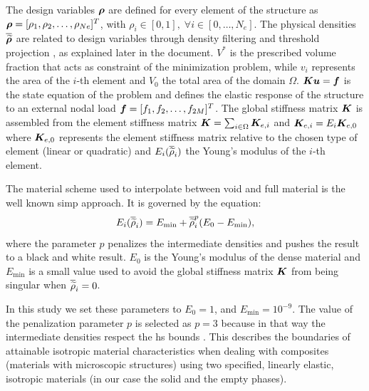 The design variables $\bm{\rho}$ are defined for every element of the structure as $\bm{\rho} = [\rho_1, \rho_2, \ldots,\rho_{Ne}]^T$, with $\rho_i \in [0,1], \; \forall i \in [0,\dots,N_e]$. The physical densities $\bm{\overline{\widetilde{\rho}}}$ are related to design variables through density filtering and threshold projection , as explained later in the document. $V^*$ is the prescribed volume fraction that acts as constraint of the minimization problem, while $v_i$ represents the area of the $i$-th element and $V_0$ the total area of the domain $\Omega$. $\bm{K}\bm{u} = \bm{f}$ is the state equation of the problem and defines the elastic response of the structure to an external nodal load $\bm{f}=[f_1, f_2, \ldots,f_{2M}]^T$. The global stiffness matrix $\bm{K}$ is assembled from the element stiffness matrix $\bm{K} = \sum_{i \in \Omega} \bm{K}_{e,i}$ and $\bm{K}_{e,i} = E_i \bm{K}_{e,0}$ where $\bm{K}_{e,0}$ represents the element stiffness matrix relative to the chosen type of element (linear or quadratic) and $E_i(\overline{\widetilde{\rho}}_i)$ the Young's modulus of the $i$-th element. 

The material scheme used to interpolate between void and full material is the well known \gls{simp}  approach. It is governed by the equation:
\begin{equation}
    E_i(\overline{\widetilde{\rho}}_i) = E_{\textrm{min}} + \overline{\widetilde{\rho}}_i^p(E_0-E_{\textrm{min}}),
    \label{eq:03_simp}
\end{equation}
where the parameter $p$ penalizes the intermediate densities and pushes the result to a black and white result. $E_0$ is the Young's modulus of the dense material and $E_{\textrm{min}}$ is a small value used to avoid the global stiffness matrix $\bm{K}$ from being singular when $\overline{\widetilde{\rho}}_i=0$. 

In this study we set these parameters to $E_0 = 1$, and $E_{\textrm{min}} = 10^{-9}$. The value of the penalization parameter $p$ is selected as $p=3$ because in that way the intermediate densities respect the \gls{hs} bounds . This describes the boundaries of attainable isotropic material characteristics when dealing with composites (materials with microscopic structures) using two specified, linearly elastic, isotropic materials (in our case the solid and the empty phases).
